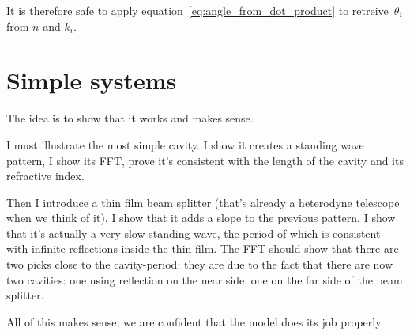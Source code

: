 It is therefore safe to apply equation~\eqref{eq:angle_from_dot_product} to retreive~$\theta_i$ from $n$ and $k_i$.


\section{Simple systems}

The idea is to show that it works and makes sense.

I must illustrate the most simple cavity.  I show it creates a standing wave pattern, I show its FFT, prove it's consistent with the length of the cavity and its refractive index.

Then I introduce a thin film beam splitter (that's already a heterodyne telescope when we think of it).  I show that it adds a slope to the previous pattern.  I show that it's actually a very slow standing wave, the period of which is consistent with infinite reflections inside the thin film.  The FFT should show that there are two picks close to the cavity-period: they are due to the fact that there are now two cavities: one using reflection on the near side, one on the far side of the beam splitter.

All of this makes sense, we are confident that the model does its job properly.
